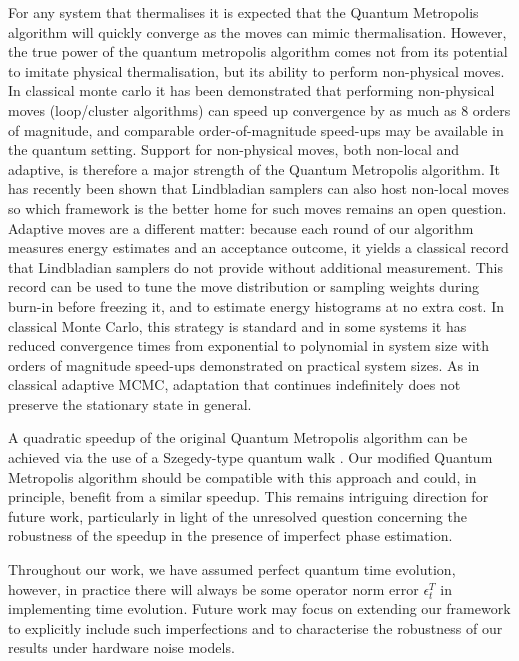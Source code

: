 \documentclass[aps,floatfix,10pt,amssymb,amsfont,amsmath,superscriptaddress,float,nofootinbib,longbibliography,nobalancelastpage,twocolumn]{revtex4-2}
\begin{document}
For any system that thermalises it is expected that the Quantum Metropolis algorithm will quickly converge as the moves can mimic thermalisation. However, the true power of the quantum metropolis algorithm comes not from its potential to imitate physical thermalisation, but its ability to perform non-physical moves. In classical monte carlo it has been demonstrated \cite{blote2002cluster,todo2019parallel} that performing non-physical moves (loop/cluster algorithms) can speed up convergence by as much as 8 orders of magnitude, and comparable order-of-magnitude speed-ups may be available in the quantum setting. Support for non-physical moves, both non-local and adaptive, is therefore a major strength of the Quantum Metropolis algorithm. It has recently been shown that Lindbladian samplers can also host non-local moves \cite{chen2025efficient} so which framework is the better home for such moves remains an open question. Adaptive moves are a different matter: because each round of our algorithm measures energy estimates and an acceptance outcome, it yields a classical record that Lindbladian samplers do not provide without additional measurement. This record can be used to tune the move distribution or sampling weights during burn-in before freezing it, and to estimate energy histograms at no extra cost. In classical Monte Carlo, this strategy is standard and in some systems it has reduced convergence times from exponential to polynomial in system size \cite{berg1992multicanonical} with orders of magnitude speed-ups demonstrated on practical system sizes. As in classical adaptive MCMC, adaptation that continues indefinitely does not preserve the stationary state in general.

A quadratic speedup \cite{yung2012quantum} of the original Quantum Metropolis algorithm can be achieved via the use of a Szegedy-type quantum walk \cite{szegedy2004quantum}. Our modified Quantum Metropolis algorithm should be compatible with this approach and could, in principle, benefit from a similar speedup. This remains intriguing direction for future work, particularly in light of the unresolved question concerning the robustness of the speedup in the presence of imperfect phase estimation. 

Throughout our work, we have assumed perfect quantum time evolution, however, in practice there will always be some operator norm error $\epsilon^T_t$ in implementing time evolution. Future work may focus on extending our framework to explicitly include such imperfections and to characterise the robustness of our results under hardware noise models.
\end{document}
